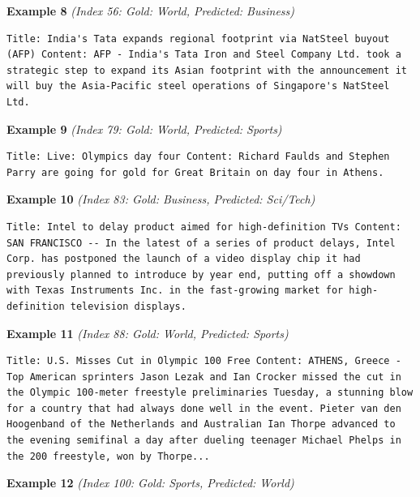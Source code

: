 \noindent
\textbf{Example 8} \quad \textit{(Index 56: Gold: World, Predicted: Business)}

\begin{Verbatim}[breaklines=true,breakanywhere=true,fontsize=\small]
Title: India's Tata expands regional footprint via NatSteel buyout (AFP) Content: AFP - India's Tata Iron and Steel Company Ltd. took a strategic step to expand its Asian footprint with the announcement it will buy the Asia-Pacific steel operations of Singapore's NatSteel Ltd.
\end{Verbatim}

\noindent
\textbf{Example 9} \quad \textit{(Index 79: Gold: World, Predicted: Sports)}

\begin{Verbatim}[breaklines=true,breakanywhere=true,fontsize=\small]
Title: Live: Olympics day four Content: Richard Faulds and Stephen Parry are going for gold for Great Britain on day four in Athens.
\end{Verbatim}

\noindent
\textbf{Example 10} \quad \textit{(Index 83: Gold: Business, Predicted: Sci/Tech)}

\begin{Verbatim}[breaklines=true,breakanywhere=true,fontsize=\small]
Title: Intel to delay product aimed for high-definition TVs Content: SAN FRANCISCO -- In the latest of a series of product delays, Intel Corp. has postponed the launch of a video display chip it had previously planned to introduce by year end, putting off a showdown with Texas Instruments Inc. in the fast-growing market for high-definition television displays.
\end{Verbatim}

\noindent
\textbf{Example 11} \quad \textit{(Index 88: Gold: World, Predicted: Sports)}

\begin{Verbatim}[breaklines=true,breakanywhere=true,fontsize=\small]
Title: U.S. Misses Cut in Olympic 100 Free Content: ATHENS, Greece - Top American sprinters Jason Lezak and Ian Crocker missed the cut in the Olympic 100-meter freestyle preliminaries Tuesday, a stunning blow for a country that had always done well in the event. Pieter van den Hoogenband of the Netherlands and Australian Ian Thorpe advanced to the evening semifinal a day after dueling teenager Michael Phelps in the 200 freestyle, won by Thorpe...
\end{Verbatim}

\noindent
\textbf{Example 12} \quad \textit{(Index 100: Gold: Sports, Predicted: World)}

